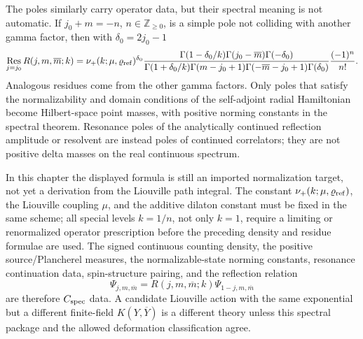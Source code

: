 The poles similarly carry operator data, but their spectral meaning is not
automatic.  If
\(j_0+m=-n\), \(n\in\mathbb Z_{\ge0}\), is a simple pole not colliding with
another gamma factor, then with \(\delta_0=2j_0-1\)
\[
  \operatorname*{Res}_{j=j_0} R(j,m,\overline m;k)
  =
  \nu_+(k;\mu,\varrho_{\rm ref})^{\delta_0}
  \frac{
  \Gamma(1-\delta_0/k)\Gamma(j_0-\overline m)\Gamma(-\delta_0)}
  {\Gamma(1+\delta_0/k)\Gamma(m-j_0+1)
  \Gamma(-\overline m-j_0+1)\Gamma(\delta_0)}
  \frac{(-1)^n}{n!}.
\]
Analogous residues come from the other gamma factors.  Only poles that satisfy
the normalizability and domain conditions of the self-adjoint radial Hamiltonian
become Hilbert-space point masses, with positive norming constants in the
spectral theorem.  Resonance poles of the analytically continued reflection
amplitude or resolvent are instead poles of continued correlators; they are not
positive delta masses on the real continuous spectrum.

In this chapter the displayed formula is still an imported normalization
target, not yet a derivation from the Liouville path integral.  The constant
\(\nu_+(k;\mu,\varrho_{\rm ref})\), the Liouville coupling \(\mu\), and the
additive dilaton constant must be fixed in the same scheme; all special levels
\(k=1/n\), not only \(k=1\), require a limiting or renormalized operator
prescription before the preceding density and residue formulae are used.  The
signed continuous counting density, the positive source/Plancherel measures,
the normalizable-state norming constants, resonance continuation data,
spin-structure pairing, and the reflection relation
\[
  \Psi_{j,m,\overline m}
  =
  R(j,m,\overline m;k)\Psi_{1-j,m,\overline m}
\]
are therefore \(C_{\rm spec}\) data.  A candidate Liouville action with the
same exponential but a different finite-field \(K(Y,\overline Y)\) is a
different theory unless this spectral package and the allowed deformation
classification agree.

